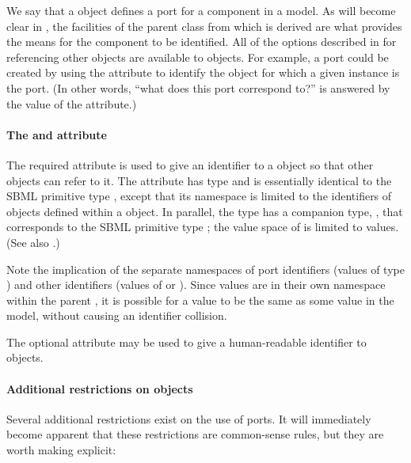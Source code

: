 We say that a \Port object defines a port for a component in a model.
As will become clear in , the facilities of the
\SBaseRef parent class from which \Port is derived are what provides the
means for the component to be identified.  All of the options described
in  for referencing other objects are available to
\Port objects.  For example, a port could be created by using the
 attribute to identify the object for which a given
\Port instance is the port.  (In other words, ``what does this port
correspond to?'' is answered by the value of the 
attribute.)


\paragraph{The \hspace*{1pt} and  attribute}

The required attribute  is used to give an identifier to a
\Port object so that other objects can refer to it.  The attribute has
type  and is essentially identical to the SBML
primitive type , except that its namespace is limited to
the identifiers of \Port objects defined within a \Model object.  In
parallel, the  type has a companion type,
, that corresponds to the SBML primitive type
; the value space of  is limited
to  values.  (See also .)

Note the implication of the separate namespaces of port identifiers
(values of type ) and other identifiers (values of
 or ).  Since  values
are in their own namespace within the parent \Model, it is possible for
a  value to be the same as some  value
in the model, without causing an identifier collision. 

The optional attribute  may be used to give a human-readable identifier to \Port objects.  


\paragraph{Additional restrictions on  objects}

Several additional restrictions exist on the use of ports.  It will
immediately become apparent that these restrictions are common-sense
rules, but they are worth making explicit:

